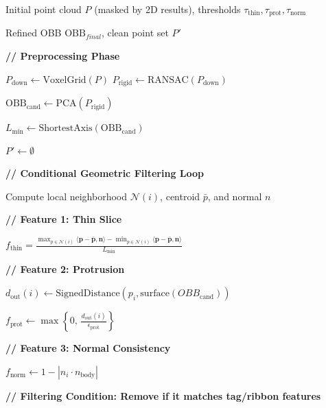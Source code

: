 \begin{algorithm}[t]
\caption{Pixel-to-3D Cross Consistency Conditional Filtering (PX3C)}
\label{alg:px3c}
\begin{algorithmic}[1]

\Require Initial point cloud $P$ (masked by 2D results), thresholds
$\tau_{\mathrm{\text{thin}}},\tau_{\mathrm{\text{prot}}},\tau_{\mathrm{norm}}$

\Ensure Refined OBB $\mathrm{OBB}_{final}$, clean point set $P'$

\State \textbf{// Preprocessing Phase}

\State $P_{\text{down}} \gets \mathrm{VoxelGrid}(P)$
\State $P_{\text{rigid}} \gets \mathrm{RANSAC}(P_{\text{down}})$

\State $\mathrm{OBB}_{\text{cand}} \gets \mathrm{PCA}(P_{\text{rigid}})$

\State $L_{\text{min}} \gets \mathrm{ShortestAxis}(\mathrm{OBB}_{\text{cand}})$

\State $P' \gets \emptyset$

\State \textbf{// Conditional Geometric Filtering Loop}


    \State Compute local neighborhood $\mathcal{N}(i)$,
           centroid $\bar{p}$, and normal $n$

    \State \textbf{// Feature 1: Thin Slice}

    \State
    $f_{\text{thin}}=\frac{\max_{p\in\mathcal{N}(i)}\langle\boldsymbol{p}-\bar{\boldsymbol{p}},\boldsymbol{n}\rangle-
\min_{p\in\mathcal{N}(i)}\langle\boldsymbol{p}-\bar{\boldsymbol{p}},\boldsymbol{n}\rangle}{L_{\min}}$

    \State \textbf{// Feature 2: Protrusion}

    \State
    $d_{\text{out}}(i)
    \gets
    \mathrm{SignedDistance}
    \!\left(
    p_i,
    \mathrm{surface}(OBB_{\text{cand}})
    \right)$

    \State
    $f_{\text{prot}}
    \gets
    \max\!\left\{0,\,
    \frac{d_{\text{out}}(i)}{\epsilon_{\text{prot}}}
    \right\}$

    \State \textbf{// Feature 3: Normal Consistency}

    \State
    $f_{\text{norm}}
    \gets
    1-\left|n_i\cdot n_{\text{body}}\right|$

    \State \textbf{// Filtering Condition: Remove if it matches tag/ribbon features}


\end{algorithmic}
\end{algorithm}

